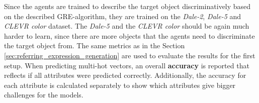 Since the agents are trained to describe the target object discriminatively based on the described GRE-algorithm, they are trained on the \emph{Dale-2}, \emph{Dale-5} and \emph{CLEVR color} dataset.
The \emph{Dale-5} and the \emph{CLEVR color} should be again much harder to learn, since there are more objects that the agents need to discriminate the target object from.
The same metrics as in the Section \ref{sec:referring_expression_generation} are used to evaluate the results for the first setup.
When predicting multi-hot vectors, an overall \textbf{accuracy} is reported that reflects if all attributes were predicted correctly.
Additionally, the accuracy for each attribute is calculated separately to show which attributes give bigger challenges for the models.

